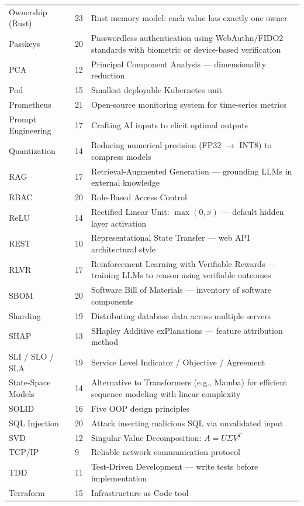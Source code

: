 \documentclass[11pt, a4paper, oneside]{report}
\newcommand{\arrow}{$\rightarrow$}
\begin{document}
{{{{{{{{{\begin{longtable}{L{0.22\textwidth} L{0.08\textwidth} L{0.60\textwidth}}
Ownership (Rust) & 23 & Rust memory model: each value has exactly one owner \\
Passkeys & 20 & Passwordless authentication using WebAuthn/FIDO2 standards with biometric or device-based verification \\
PCA & 12 & Principal Component Analysis --- dimensionality reduction \\
Pod & 15 & Smallest deployable Kubernetes unit \\
Prometheus & 21 & Open-source monitoring system for time-series metrics \\
Prompt Engineering & 17 & Crafting AI inputs to elicit optimal outputs \\
Quantization & 14 & Reducing numerical precision (FP32 \arrow{} INT8) to compress models \\
RAG & 17 & Retrieval-Augmented Generation --- grounding LLMs in external knowledge \\
RBAC & 20 & Role-Based Access Control \\
ReLU & 14 & Rectified Linear Unit: $\max(0,x)$ --- default hidden layer activation \\
REST & 10 & Representational State Transfer --- web API architectural style \\
RLVR & 17 & Reinforcement Learning with Verifiable Rewards --- training LLMs to reason using verifiable outcomes \\
SBOM & 20 & Software Bill of Materials --- inventory of software components \\
Sharding & 19 & Distributing database data across multiple servers \\
SHAP & 13 & SHapley Additive exPlanations --- feature attribution method \\
SLI / SLO / SLA & 19 & Service Level Indicator / Objective / Agreement \\
State-Space Models & 14 & Alternative to Transformers (e.g., Mamba) for efficient sequence modeling with linear complexity \\
SOLID & 16 & Five OOP design principles \\
SQL Injection & 20 & Attack inserting malicious SQL via unvalidated input \\
SVD & 12 & Singular Value Decomposition: $A = U\Sigma V^T$ \\
TCP/IP & 9 & Reliable network communication protocol \\
TDD & 11 & Test-Driven Development --- write tests before implementation \\
Terraform & 15 & Infrastructure as Code tool \\

\end{longtable}}}}}}}}}}
\end{document}
